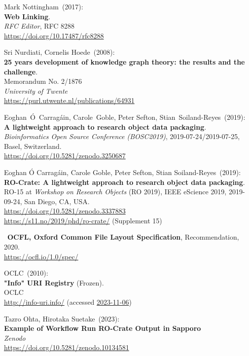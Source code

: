 \begin{thebibliography}{9}
Mark Nottingham~(2017): \\
\textbf{Web {Linking}}.\\
\emph{RFC Editor}, RFC 8288\\
\url{https://doi.org/10.17487/rfc8288}

Sri Nurdiati, Cornelis Hoede~(2008): \\
\textbf{25 years development of knowledge graph theory: the results and the challenge}.\\
Memorandum No. 2/1876\\
\emph{University of Twente}\\
\url{https://purl.utwente.nl/publications/64931}

Eoghan~Ó~Carragáin, Carole~Goble, Peter Sefton, Stian~Soiland-Reyes~(2019): \\
\textbf{A lightweight approach to research object data packaging}.\\
\emph{Bioinformatics Open Source Conference (BOSC2019)},
2019-07-24/2019-07-25, Basel, Switzerland.\\
\url{https://doi.org/10.5281/zenodo.3250687}

Eoghan Ó Carragáin, Carole Goble, Peter Sefton, Stian Soiland-Reyes~(2019): \\
\textbf{RO-Crate: A lightweight approach to research object data packaging}.\\
RO-15 at \emph{Workshop on Research Objects} (RO 2019), IEEE eScience 2019, 2019-09-24, San Diego, CA, USA.\\
\url{https://doi.org/10.5281/zenodo.3337883}\\
\url{https://s11.no/2019/phd/ro-crate/}
(Supplement 15)

~\textbf{OCFL, Oxford Common File Layout Specification}, Recommendation, 2020.\\
\url{https://ocfl.io/1.0/spec/}

OCLC~(2010): \\
\textbf{"Info" {URI Registry}} ({Frozen}). \\
OCLC\\
\url{http://info-uri.info/} 
(accessed \href{https://web.archive.org/web/20231106015204/https://oclc-research.github.io/infoURI-Frozen/}{2023-11-06})

Tazro Ohta, Hirotaka Suetake~(2023): \\
\textbf{Example of Workflow Run RO-Crate Output in Sapporo}\\
\emph{Zenodo}\\
\url{https://doi.org/10.5281/zenodo.10134581}


\end{thebibliography}
